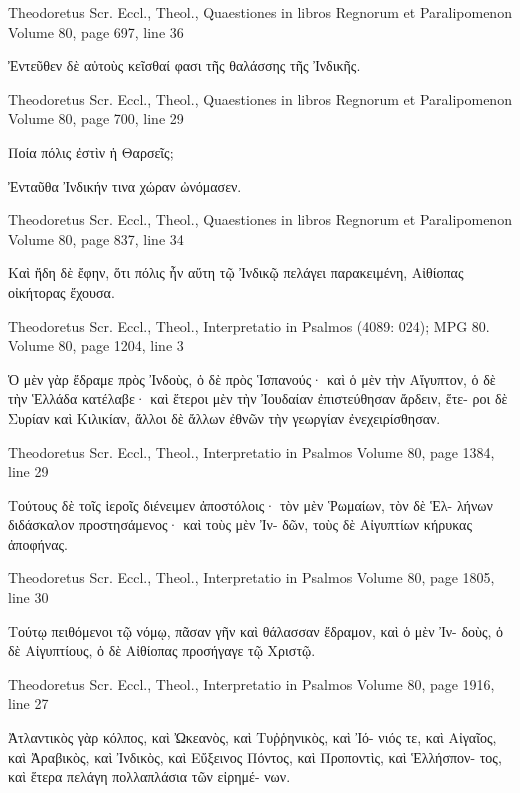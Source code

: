 \documentclass[12pt,letterpaper,twoside,final]{memoir}
\begin{document}
\begin{greek}
Theodoretus Scr. Eccl., Theol., Quaestiones in libros Regnorum et Paralipomenon 
Volume 80, page 697, line 36

                Ἐντεῦθεν δὲ αὐτοὺς κεῖσθαί φασι τῆς 
θαλάσσης τῆς Ἰνδικῆς. 



Theodoretus Scr. Eccl., Theol., Quaestiones in libros Regnorum et Paralipomenon 
Volume 80, page 700, line 29

Ποία πόλις ἐστὶν ἡ Θαρσεῖς;


 Ἐνταῦθα Ἰνδικήν τινα χώραν ὠνόμασεν. 



Theodoretus Scr. Eccl., Theol., Quaestiones in libros Regnorum et Paralipomenon 
Volume 80, page 837, line 34

           Καὶ ἤδη δὲ ἔφην, ὅτι πόλις ἦν αὕτη τῷ 
Ἰνδικῷ πελάγει παρακειμένη, Αἰθίοπας οἰκήτορας 
ἔχουσα. 



Theodoretus Scr. Eccl., Theol., Interpretatio in Psalmos (4089: 024); MPG 80.
Volume 80, page 1204, line 3

                                    Ὁ μὲν γὰρ 
ἔδραμε πρὸς Ἰνδοὺς, ὁ δὲ πρὸς Ἱσπανούς· καὶ ὁ 
μὲν τὴν Αἴγυπτον, ὁ δὲ τὴν Ἑλλάδα κατέλαβε· καὶ 
ἕτεροι μὲν τὴν Ἰουδαίαν ἐπιστεύθησαν ἄρδειν, ἕτε-
ροι δὲ Συρίαν καὶ Κιλικίαν, ἄλλοι δὲ ἄλλων 
ἐθνῶν τὴν γεωργίαν ἐνεχειρίσθησαν. 



Theodoretus Scr. Eccl., Theol., Interpretatio in Psalmos 
Volume 80, page 1384, line 29

                              Τούτους δὲ τοῖς ἱεροῖς 
διένειμεν ἀποστόλοις· τὸν μὲν Ῥωμαίων, τὸν δὲ Ἑλ-
λήνων διδάσκαλον προστησάμενος· καὶ τοὺς μὲν Ἰν-
δῶν, τοὺς δὲ Αἰγυπτίων κήρυκας ἀποφήνας. 



Theodoretus Scr. Eccl., Theol., Interpretatio in Psalmos 
Volume 80, page 1805, line 30

                        Τούτῳ πειθόμενοι τῷ νόμῳ, 
πᾶσαν γῆν καὶ θάλασσαν ἔδραμον, καὶ ὁ μὲν Ἰν-
δοὺς, ὁ δὲ Αἰγυπτίους, ὁ δὲ Αἰθίοπας προσήγαγε 
τῷ Χριστῷ. 



Theodoretus Scr. Eccl., Theol., Interpretatio in Psalmos 
Volume 80, page 1916, line 27

                                          Ἀτλαντικὸς 
γὰρ κόλπος, καὶ Ὠκεανὸς, καὶ Τυῤῥηνικὸς, καὶ Ἰό-
νιός τε, καὶ Αἰγαῖος, καὶ Ἀραβικὸς, καὶ Ἰνδικὸς, 
καὶ Εὔξεινος Πόντος, καὶ Προποντὶς, καὶ Ἑλλήσπον-
τος, καὶ ἕτερα πελάγη πολλαπλάσια τῶν εἰρημέ-
νων. 



\end{greek}
\end{document}
